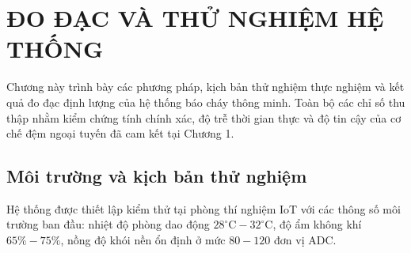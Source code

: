 \section{ĐO ĐẠC VÀ THỬ NGHIỆM HỆ THỐNG}

Chương này trình bày các phương pháp, kịch bản thử nghiệm thực nghiệm và kết quả đo đạc định lượng của hệ thống báo cháy thông minh. Toàn bộ các chỉ số thu thập nhằm kiểm chứng tính chính xác, độ trễ thời gian thực và độ tin cậy của cơ chế đệm ngoại tuyến đã cam kết tại Chương 1.

\subsection{Môi trường và kịch bản thử nghiệm}
Hệ thống được thiết lập kiểm thử tại phòng thí nghiệm IoT với các thông số môi trường ban đầu: nhiệt độ phòng dao động $28^\circ\text{C} - 32^\circ\text{C}$, độ ẩm không khí $65\% - 75\%$, nồng độ khói nền ổn định ở mức $80 - 120$ đơn vị ADC.

